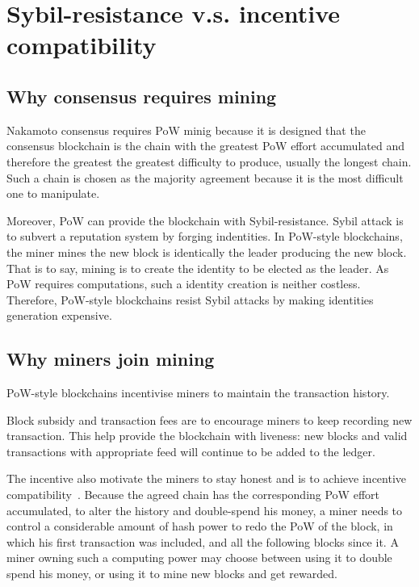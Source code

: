 \section{Sybil-resistance v.s. incentive compatibility}

\subsection{Why consensus requires mining}

Nakamoto consensus requires PoW minig because it is designed that the consensus blockchain is the chain with the greatest PoW effort accumulated and therefore the greatest the greatest difficulty to produce, usually the longest chain.
Such a chain is chosen as the majority agreement because it is the most difficult one to manipulate.

Moreover, PoW can provide the blockchain with Sybil-resistance.
Sybil attack is to subvert a reputation system by forging indentities.
In PoW-style blockchains, the miner mines the new block is identically the leader producing the new block.
That is to say, mining is to create the identity to be elected as the leader.
As PoW requires computations, such a identity creation is neither costless.
Therefore, PoW-style blockchains resist Sybil attacks by making identities generation expensive.

\subsection{Why miners join mining}

PoW-style blockchains incentivise miners to maintain the transaction history.

Block subsidy and transaction fees are to encourage miners to keep recording new transaction.
This help provide the blockchain with liveness: new blocks and valid transactions with appropriate feed will continue to be added to the ledger.

The incentive also motivate the miners to stay honest and is to achieve incentive compatibility~\cite{}.
Because the agreed chain has the corresponding PoW effort accumulated, to alter the history and double-spend his money, a miner needs to control a considerable amount of hash power to redo the PoW of the block, in which his first transaction was included, and all the following blocks since it.
A miner owning such a computing power may choose between using it to double spend his money, or using it to mine new blocks and get rewarded. 

